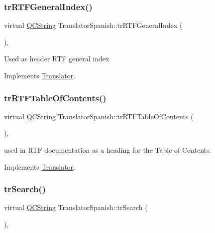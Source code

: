 \mbox{\label{class_translator_spanish_a1eb868c8a04a4f021fb51b2272a68a19}} 
\subsubsection{\texorpdfstring{trRTFGeneralIndex()}{trRTFGeneralIndex()}}
{\footnotesize\ttfamily virtual \mbox{\hyperlink{class_q_c_string}{Q\+C\+String}} Translator\+Spanish\+::tr\+R\+T\+F\+General\+Index (\begin{DoxyParamCaption}{ }\end{DoxyParamCaption})\hspace{0.3cm}{\ttfamily [inline]}, {\ttfamily [virtual]}}

Used as header R\+TF general index 

Implements \mbox{\hyperlink{class_translator}{Translator}}.

\mbox{\label{class_translator_spanish_a95f6502c25f8d5040616c816581d17e4}} 
\subsubsection{\texorpdfstring{trRTFTableOfContents()}{trRTFTableOfContents()}}
{\footnotesize\ttfamily virtual \mbox{\hyperlink{class_q_c_string}{Q\+C\+String}} Translator\+Spanish\+::tr\+R\+T\+F\+Table\+Of\+Contents (\begin{DoxyParamCaption}{ }\end{DoxyParamCaption})\hspace{0.3cm}{\ttfamily [inline]}, {\ttfamily [virtual]}}

used in R\+TF documentation as a heading for the Table of Contents. 

Implements \mbox{\hyperlink{class_translator}{Translator}}.

\mbox{\label{class_translator_spanish_a02918a39fe1e4dade39b837a6075f312}} 
\subsubsection{\texorpdfstring{trSearch()}{trSearch()}}
{\footnotesize\ttfamily virtual \mbox{\hyperlink{class_q_c_string}{Q\+C\+String}} Translator\+Spanish\+::tr\+Search (\begin{DoxyParamCaption}{ }\end{DoxyParamCaption})\hspace{0.3cm}{\ttfamily [inline]}, {\ttfamily [virtual]}}

